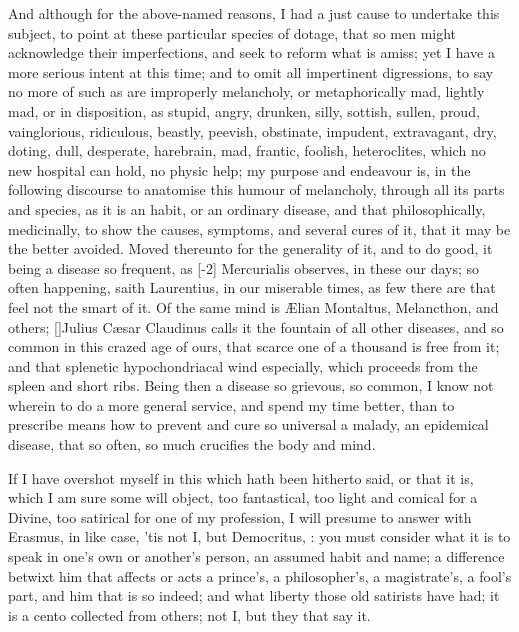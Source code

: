 {And although for the above-named reasons, I had a just cause to
undertake this subject, to point at these particular species of dotage,
that so men might acknowledge their imperfections, and seek to reform
what is amiss; yet I have a more serious intent at this time; and to
omit all impertinent digressions, to say no more of such as are
improperly melancholy, or metaphorically mad, lightly mad, or in
disposition, as stupid, angry, drunken, silly, sottish, sullen, proud,
vainglorious, ridiculous, beastly, peevish, obstinate, impudent,
extravagant, dry, doting, dull, desperate, harebrain, \etc{} mad, frantic,
foolish, heteroclites, which no new  hospital can hold, no physic
help; my purpose and endeavour is, in the following discourse to
anatomise this humour of melancholy, through all its parts and species,
as it is an habit, or an ordinary disease, and that philosophically,
medicinally, to show the causes, symptoms, and several cures of it,
that it may be the better avoided. Moved thereunto for the generality
of it, and to do good, it being a disease so frequent, as [-2\baselineskip]
Mercurialis observes, in these our days; so often happening, saith
 Laurentius, in our miserable times, as few there are that feel
not the smart of it. Of the same mind is \AE{}lian Montaltus,
Melancthon, and others; [\baselineskip]Julius C\ae{}sar Claudinus calls it the
fountain of all other diseases, and so common in this crazed age of
ours, that scarce one of a thousand is free from it; and that splenetic
hypochondriacal wind especially, which proceeds from the spleen and
short ribs. Being then a disease so grievous, so common, I know not
wherein to do a more general service, and spend my time better, than to
prescribe means how to prevent and cure so universal a malady, an
epidemical disease, that so often, so much crucifies the body and mind.

If I have overshot myself in this which hath been hitherto said, or
that it is, which I am sure some will object, too fantastical, too
light and comical for a Divine, too satirical for one of my profession,
I will presume to answer with Erasmus, in like case, 'tis not I,
but Democritus, : you must consider what it is to speak
in one's own or another's person, an assumed habit and name; a
difference betwixt him that affects or acts a prince's, a
philosopher's, a magistrate's, a fool's part, and him that is so
indeed; and what liberty those old satirists have had; it is a cento
collected from others; not I, but they that say it.

}
